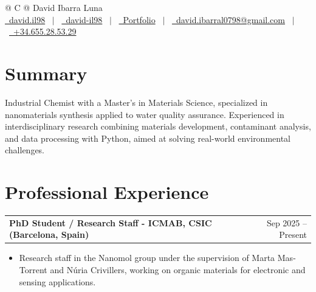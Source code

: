 \documentclass[a4paper,12pt]{article}
\makeatletter
\newenvironment{joblong}[2]
    {
    \begin{tabularx}{\linewidth}{@{}l X r@{}}
    \textbf{#1} & \hfill &  #2 \\[3.75pt]
    \end{tabularx}
    \begin{minipage}[t]{\linewidth}
    \begin{itemize}[nosep,after=\strut, leftmargin=1em, itemsep=3pt,label=--]
    }
    {
    \end{itemize}
    \end{minipage}    
    }
\makeatother
\begin{document}
\pagestyle{empty} 


\begin{tabularx}{\linewidth}{@{} C @{}}
\Huge{David Ibarra Luna} \\[7pt]
\href{https://github.com/davidil98}{\raisebox{-0.05\height}\faGithub\ david.il98} \ $|$ \ 
\href{https://www.linkedin.com/in/david-il98}{\raisebox{-0.05\height}\faLinkedin\ david-il98} \ $|$ \ 
\href{https://david-ibarra-portafolio.onrender.com/}{\raisebox{-0.05\height}\faGlobe \ Portfolio} \ $|$ \  
\href{mailto:david.ibarral0798@gmail.com}{\raisebox{-0.05\height}\faEnvelope \ david.ibarral0798@gmail.com} \ $|$ \ 
\href{tel:+34675105523}{\raisebox{-0.05\height}\faMobile \ +34.655.28.53.29} \\
\end{tabularx}


\section{Summary}
Industrial Chemist with a Master's in Materials Science, specialized in nanomaterials synthesis applied to water quality assurance. Experienced in interdisciplinary research combining materials development, contaminant analysis, and data processing with Python, aimed at solving real-world environmental challenges.

\section{Professional Experience}

\begin{joblong}{PhD Student / Research Staff - ICMAB, CSIC (Barcelona, Spain)}{Sep 2025 -- Present}
\item	Research staff in the Nanomol group under the supervision of Marta Mas-Torrent and Núria Crivillers, working on organic materials for electronic and sensing applications.
\end{joblong}
\end{document}
